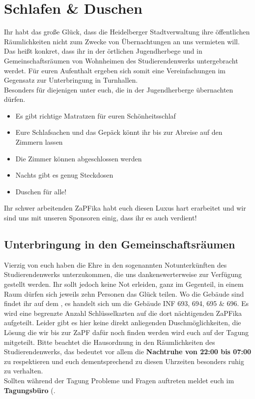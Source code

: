 
\section{Schlafen \& Duschen}
Ihr habt das große Glück, dass die Heidelberger Stadtverwaltung ihre öffentlichen Räumlichkeiten nicht zum Zwecke von Übernachtungen an uns vermieten will. Das heißt konkret, dass ihr in der örtlichen Jugendherbege und in Gemeinschaftsräumen von Wohnheimen des Studierendenwerks untergebracht werdet. Für euren Aufenthalt ergeben sich somit eine Vereinfachungen im Gegensatz zur Unterbringung in Turnhallen.\\
Besonders für diejenigen unter euch, die in der Jugendherberge übernachten dürfen.
\begin{itemize}
  \item Es gibt richtige Matratzen für euren Schönheitsschlaf
  \item Eure Schlafsachen und das Gepäck könnt ihr bis zur Abreise auf den Zimmern lassen
  \item Die Zimmer können abgeschlossen werden
  \item Nachts gibt es genug Steckdosen
  \item Duschen für alle!
\end{itemize}
Ihr schwer arbeitenden ZaPFika habt euch diesen Luxus hart erarbeitet und wir sind uns mit unseren Sponsoren einig, dass ihr es auch verdient! \\

\subsection{Unterbringung in den Gemeinschaftsräumen}
Vierzig von euch haben die Ehre in den sogenannten Notunterkünften des Studierendenwerks unterzukommen, die uns dankenswerterweise zur Verfügung gestellt werden. 
Ihr sollt jedoch keine Not erleiden, ganz im Gegenteil, in einem Raum dürfen sich jeweils zehn Personen das Glück teilen. Wo die Gebäude sind findet ihr auf dem , es handelt sich um die Gebäude INF 693, 694, 695 \& 696. Es wird eine begrenzte Anzahl Schlüsselkarten auf die dort nächtigenden ZaPFika aufgeteilt. Leider gibt es hier keine direkt anliegenden Duschmöglichkeiten, die Lösung die wir bis zur ZaPF dafür noch finden werden wird euch auf der Tagung mitgeteilt.
Bitte beachtet die Hausordnung in den Räumlichkeiten des Studierendenwerks, das bedeutet vor allem die \textbf{Nachtruhe von 22:00 bis 07:00} zu respektieren und euch dementsprechend zu diesen Uhrzeiten besonders ruhig zu verhalten.\\
Sollten während der Tagung Probleme und Fragen auftreten meldet euch im \textbf{Tagungsbüro} (.

